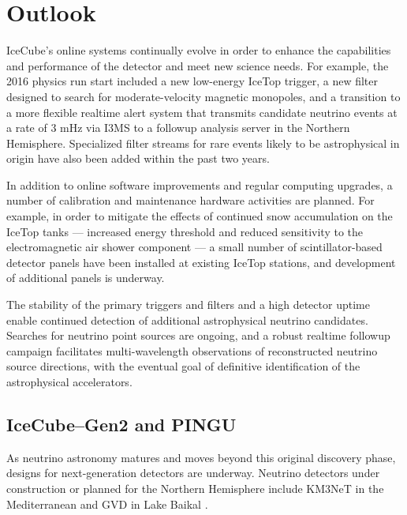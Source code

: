 \section{Outlook}

IceCube's online systems continually evolve in order to enhance the
capabilities and performance of the detector and meet new science needs.  
For example, the 2016 physics run start
included a new low-energy IceTop trigger, a new filter designed to search for
moderate-velocity magnetic monopoles, and a transition to a more flexible
realtime alert system that transmits candidate neutrino events at a rate of
3 mHz via I3MS to a followup analysis server in the Northern Hemisphere.
Specialized filter streams for rare events likely to be astrophysical in
origin have also been added within the past two years.  

In addition to online software improvements and regular computing upgrades, a
number of calibration and maintenance hardware activities are 
planned. For example, in order to mitigate the effects of continued snow
accumulation on the IceTop tanks --- increased energy threshold and reduced
sensitivity to the electromagnetic air shower component --- a small number
of scintillator-based  detector panels have been installed at existing
IceTop stations, and development of additional panels is underway.

The stability of the primary triggers and filters and a high detector
uptime enable continued detection of additional astrophysical neutrino
candidates.  Searches for neutrino point sources are ongoing, and a robust
realtime followup campaign facilitates multi-wavelength observations of
reconstructed neutrino source directions, with the eventual goal of
definitive identification of the astrophysical accelerators.

\subsection{IceCube--Gen2 and PINGU}

As neutrino astronomy matures and moves beyond this original discovery phase, designs
for next-generation detectors are underway.   Neutrino
detectors under construction or planned for the Northern Hemisphere include
KM3NeT in the Mediterranean \cite{km3net} and GVD in Lake Baikal \cite{gvd}.  

